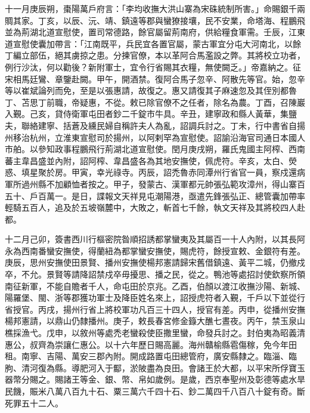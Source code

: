 \begin{pinyinscope}
 十一月庚辰朔，棗陽萬戶府言：「李均收撫大洪山寨為宋硃統制所害。」命賜銀千兩賙其家。丁亥，以辰、沅、靖、鎮遠等郡與蠻獠接壤，民不安業，命塔海、程鵬飛並為荊湖北道宣慰使，置司常德路，餘官屬留荊南府，供給糧食軍需。壬辰，江東道宣慰使囊加帶言：「江南既平，兵民宜各置官屬，蒙古軍宜分屯大河南北，以餘丁編立部伍，絕其虜掠之患。分揀官僚，本以革阿合馬濫設之弊。其將校立功者，例行沙汰，何以勸後？新附軍士，宜令行省賜其衣糧，無使闕乏。」帝嘉納之。征宋相馬廷鸞、章鑒赴闕。甲午，開酒禁。復阿合馬子忽辛、阿散先等官。始，忽辛等以崔斌論列而免，至是以張惠請，故復之。惠又請復其子麻速忽及其侄別都魯丁、苫思丁前職，帝疑惠，不從。敕已除官僚不之任者，除名為農。丁酉，召陳巖入覲。己亥，貸侍衛軍屯田者鈔二千錠市牛具。辛丑，建寧政和縣人黃華，集鹽夫，聯絡建寧、括蒼及纁民婦自稱許夫人為亂，詔調兵討之。丁未，行中書省自揚州移治杭州，立淮東宣慰司於揚州，以阿剌罕為宣慰使。詔諭沿海官司通日本國人市舶。以參知政事程鵬飛行荊湖北道宣慰使。閏月庚戌朔，羅氏鬼國主阿榨、西南蕃主韋昌盛並內附，詔阿榨、韋昌盛各為其地安撫使，佩虎符。辛亥，太白、熒惑、填星聚於房。甲寅，幸光祿寺。丙辰，詔禿魯赤同潭州行省官一員，察戍還病軍所過州縣不加顧恤者按之。甲子，發蒙古、漢軍都元帥張弘範攻漳州，得山寨百五十、戶百萬一。是日，諜報文天祥見屯潮陽港，亟遣先鋒張弘正、總管囊加帶率輕騎五百人，追及於五坡嶺麓中，大敗之，斬首七千餘，執文天祥及其將校四人赴都。



 十二月己卯，簽書西川行樞密院昝順招誘都掌蠻夷及其屬百一十人內附，以其長阿永為西南番蠻安撫使，得蘭紐為都掌蠻安撫使，賜虎符，餘授宣敕、金銀符有差。庚辰，思州安撫使田景賢、播州安撫使楊邦憲請歸宋舊借鎮遠、黃平二城，仍撤戍卒，不允。景賢等請降詔禁戍卒毋擾思、播之民，從之。鴨池等處招討使欽察所領南征新軍，不能自贍者千人，命屯田於京兆。乙酉，伯顏以渡江收撫沙陽、新城、陽羅堡、閩、浙等郡獲功軍士及降臣姓名來上，詔授虎符者入覲，千戶以下並從行省授官。丙戌，揚州行省上將校軍功凡百三十四人，授官有差。丙申，從播州安撫楊邦憲請，以鼎山仍隸播州。庚子，敕長春宮修金籙大醮七晝夜。丙午，禁玉泉山樵採漁弋。戊申，以敘州等處禿老蠻殺使臣撒里蠻，命發兵討之。封伯夷為昭義清惠公，叔齊為崇讓仁惠公。以十六年歷日賜高麗。海州贛榆縣雹傷稼，免今年田租。南寧、吉陽、萬安三郡內附。開成路置屯田總管府，廣安縣隸之。臨淄、臨朐、清河復為縣。導肥河入于酅，淤陂盡為良田。會諸王於大都，以平宋所俘寶玉器幣分賜之。賜諸王等金、銀、幣、帛如歲例。是歲，西京奉聖州及彰德等處水旱民饑，賑米八萬八百九十石、粟三萬六千四十石、鈔二萬四千八百八十錠有奇。斷死罪五十二人。




\end{pinyinscope}
